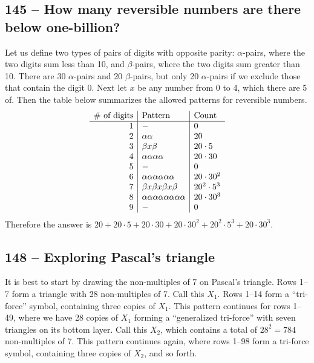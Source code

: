 \documentclass{article}
\begin{document}
\subsection*{145 -- How many reversible numbers are there below one-billion?} 
Let us define two types of pairs of digits with opposite parity: $\alpha$-pairs, where the two digits sum less than 10, and $\beta$-pairs, where the two digits sum greater than 10. 
There are 30 $\alpha$-pairs and 20 $\beta$-pairs, but only 20 $\alpha$-pairs if we exclude those that contain the digit 0. 
Next let $x$ be any number from 0 to 4, which there are 5 of. 
Then the table below summarizes the allowed patterns for reversible numbers.
\begin{align*}
	\begin{array}{r | l | l} 
	\text{\# of digits} & \text{Pattern} & \text{Count} \\ \hline
	1 & - & 0 \\
	2 & \alpha\alpha & 20 \\
	3 & \beta x \beta & 20\cdot 5 \\
	4 & \alpha\alpha\alpha\alpha & 20 \cdot 30 \\
	5 & - & 0 \\
	6 & \alpha\alpha\alpha\alpha\alpha\alpha & 20 \cdot 30^2 \\
	7 & \beta x \beta x \beta x \beta & 20^2 \cdot 5^3 \\
	8 & \alpha\alpha\alpha\alpha\alpha\alpha\alpha\alpha & 20 \cdot 30^3 \\
	9 & - & 0 \end{array}
\end{align*}
Therefore the answer is $\boxed{20 + 20\cdot 5 + 20 \cdot 30 + 20 \cdot 30^2 + 20^2 \cdot 5^3 + 20 \cdot 30^3}$.


\subsection*{148 -- Exploring Pascal's triangle}
It is best to start by drawing the non-multiples of 7 on Pascal's triangle.
Rows 1--7 form a triangle with 28 non-multiples of 7.
Call this $X_1$.
Rows 1--14 form a ``tri-force'' symbol, containing three copies of $X_1$.
This pattern continues for rows 1--49, where we have 28 copies of $X_1$ forming a ``generalized tri-force'' with seven triangles on its bottom layer.
Call this $X_2$, which contains a total of $28^2 = 784$ non-multiples of 7.
This pattern continues again, where rows 1--98 form a tri-force symbol, containing three copies of $X_2$, and so forth. \\
\end{document}
